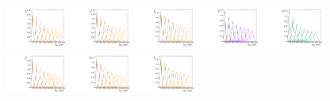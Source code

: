 \begin{figure}[htbp]
  \centering
  \includegraphics[width=0.18\textwidth]{fig/analysis/templateSignalVsMX_fromDC_GbuToWW_MVV_mu_HP_bb_DEtaLo.pdf}
  \includegraphics[width=0.18\textwidth]{fig/analysis/templateSignalVsMX_fromDC_RadToWW_MVV_mu_HP_bb_DEtaLo.pdf}
  \includegraphics[width=0.18\textwidth]{fig/analysis/templateSignalVsMX_fromDC_ZprToWW_MVV_mu_HP_bb_DEtaLo.pdf}
  \includegraphics[width=0.18\textwidth]{fig/analysis/templateSignalVsMX_fromDC_WprToWZ_MVV_mu_HP_bb_DEtaLo.pdf}
  \includegraphics[width=0.18\textwidth]{fig/analysis/templateSignalVsMX_fromDC_WprToWH_MVV_mu_HP_bb_DEtaLo.pdf}\\
  \includegraphics[width=0.18\textwidth]{fig/analysis/templateSignalVsMX_fromDC_GbuToWW_MVV_mu_LP_bb_DEtaLo.pdf}
  \includegraphics[width=0.18\textwidth]{fig/analysis/templateSignalVsMX_fromDC_RadToWW_MVV_mu_LP_bb_DEtaLo.pdf}
  \includegraphics[width=0.18\textwidth]{fig/analysis/templateSignalVsMX_fromDC_ZprToWW_MVV_mu_LP_bb_DEtaLo.pdf}

\end{figure}
